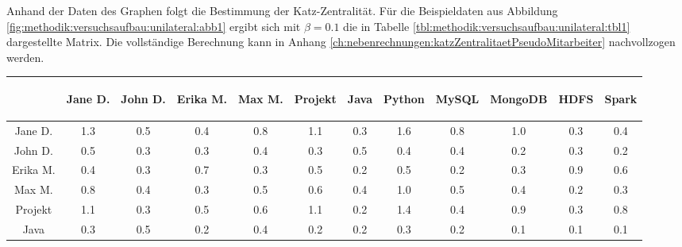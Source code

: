 Anhand der Daten des Graphen folgt die Bestimmung der Katz-Zentralität. Für die Beispieldaten aus Abbildung \ref{fig:methodik:versuchsaufbau:unilateral:abb1} ergibt sich mit $\beta = 0.1$ die in Tabelle \ref{tbl:methodik:versuchsaufbau:unilateral:tbl1} dargestellte Matrix. Die vollständige Berechnung kann in Anhang \ref{ch:nebenrechnungen:katzZentralitaetPseudoMitarbeiter} nachvollzogen werden.

\begin{table}[h]
	\centering
	\begin{tabular}{c|c|c|c|c|c|c|c|c|c|c|c}
		& \begin{sideways}Jane D.\end{sideways} & \begin{sideways}John D.\end{sideways} & \begin{sideways}Erika M.\end{sideways} & \begin{sideways}Max M.\end{sideways} & \begin{sideways}Projekt\end{sideways} & \begin{sideways}Java\end{sideways} & \begin{sideways}Python\end{sideways} & \begin{sideways}MySQL\end{sideways} & \begin{sideways}MongoDB\end{sideways} & \begin{sideways}HDFS\end{sideways} & \begin{sideways}Spark\end{sideways} \\
		\hline
		Jane D.  & 1.3 & 0.5 & 0.4 & 0.8 & 1.1 & 0.3 & 1.6 & 0.8 & 1.0 & 0.3 & 0.4\\
		John D.  & 0.5 & 0.3 & 0.3 & 0.4 & 0.3 & 0.5 & 0.4 & 0.4 & 0.2 & 0.3 & 0.2\\
		Erika M. & 0.4 & 0.3 & 0.7 & 0.3 & 0.5 & 0.2 & 0.5 & 0.2 & 0.3 & 0.9 & 0.6\\
		Max M.   & 0.8 & 0.4 & 0.3 & 0.5 & 0.6 & 0.4 & 1.0 & 0.5 & 0.4 & 0.2 & 0.3\\
		Projekt  & 1.1 & 0.3 & 0.5 & 0.6 & 1.1 & 0.2 & 1.4 & 0.4 & 0.9 & 0.3 & 0.8\\
		Java     & 0.3 & 0.5 & 0.2 & 0.4 & 0.2 & 0.2 & 0.3 & 0.2 & 0.1 & 0.1 & 0.1\\

\end{tabular}
\end{table}
